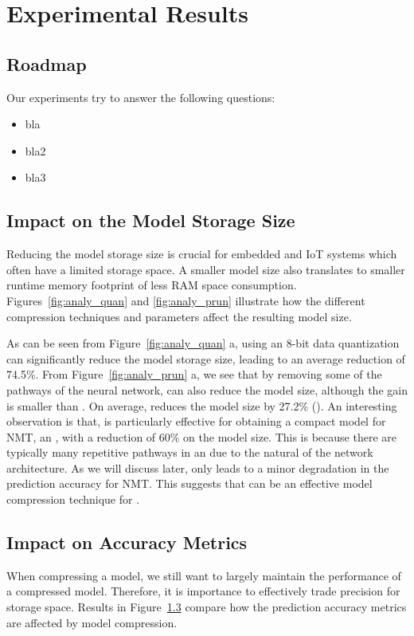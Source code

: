 \section{Experimental Results}


\subsection{Roadmap}
Our experiments try to answer the following questions:

\begin{itemize}
\item bla
\item bla2
\item bla3
\end{itemize}

\subsection{Impact on the Model Storage Size}
Reducing the model storage size is crucial for embedded and IoT systems which often have a limited storage space. A smaller model size also
translates to smaller runtime memory footprint of less RAM space consumption. Figures~\ref{fig:analy_quan} and  \ref{fig:analy_prun}
illustrate how the different compression techniques and parameters affect the resulting model size.

As can be seen from Figure~\ref{fig:analy_quan} a, using an 8-bit data quantization can significantly reduce the model storage size,
leading to an average reduction of 74.5\%. From Figure~\ref{fig:analy_prun} a, we see that by removing some of the pathways of the neural
network, \pruning can also reduce the model size, although the gain is smaller than \quantization. On average, \pruning reduces the model
size by 27.2\% (). An interesting observation is that, \pruning is particularly effective for obtaining a compact model for
NMT, an \RNN, with a reduction of 60\% on the model size. This is because there are typically many repetitive pathways in an \RNN due to
the natural of the network architecture. As we will discuss later, \pruning only leads to a minor degradation in the prediction accuracy
for NMT. This suggests that \pruning can be an effective model compression technique for \RNNs.



\subsection{Impact on Accuracy Metrics}
When compressing a model, we still want to largely maintain the performance of a compressed model. Therefore, it is importance to
effectively trade precision for storage space. Results in Figure~\ref{} compare how the prediction accuracy metrics are affected by model
compression.

